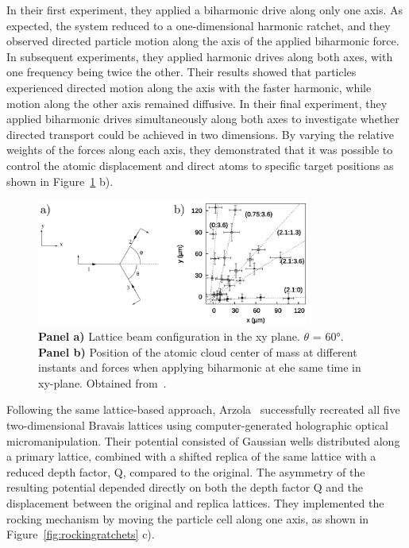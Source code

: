  In their first experiment, they applied a biharmonic drive along only one axis. As expected, the system reduced to a one-dimensional harmonic ratchet, and they observed directed particle motion along the axis of the applied biharmonic force. In subsequent experiments, they applied harmonic drives along both axes, with one frequency being twice the other. Their results showed that particles experienced directed motion along the axis with the faster harmonic, while motion along the other axis remained diffusive. In their final experiment, they applied biharmonic drives simultaneously along both axes to investigate whether directed transport could be achieved in two dimensions. By varying the relative weights of the forces along each axis, they demonstrated that it was possible to control the atomic displacement and direct atoms to specific target positions as shown in Figure~\ref{fig:lebedevexperiment} b).


 \begin{figure}[h]
  \begin{center}
    \includegraphics[width=0.80\textwidth]{figures/LebedevExperiment.png}
  \end{center}
  \caption[Lebedev experiment.]{\textbf{Panel a)} Lattice beam configuration in the xy plane. $\theta$ = 60°. \textbf{Panel b)} Position of the atomic cloud center of mass at different instants and forces when applying biharmonic at ehe same time in xy-plane. Obtained from~\cite{lebedev2009two}.}\label{fig:lebedevexperiment}
 \end{figure}

 Following the same lattice-based approach, Arzola~\cite{arzola2017omnidirectional} successfully recreated all five two-dimensional Bravais lattices using computer-generated holographic optical micromanipulation. Their potential consisted of Gaussian wells distributed along a primary lattice, combined with a shifted replica of the same lattice with a reduced depth factor, Q, compared to the original. The asymmetry of the resulting potential depended directly on both the depth factor Q and the displacement between the original and replica lattices. They implemented the rocking mechanism by moving the particle cell along one axis, as shown in Figure~\ref{fig:rockingratchets} c).

